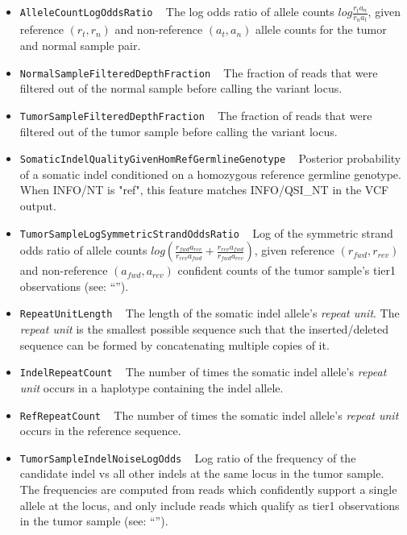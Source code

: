 \documentclass{article}
\begin{document}
\begin{itemize}
    \item \texttt{AlleleCountLogOddsRatio} ~ The log odds ratio of allele counts $log{\frac{r_t a_n} {r_n a_t}}$, given reference $(r_t,r_n)$ and non-reference $(a_t,a_n)$ allele counts for the tumor and normal sample pair.

    \item \texttt{NormalSampleFilteredDepthFraction} ~ The fraction of reads that were filtered out of the normal sample before calling the variant locus.

    \item \texttt{TumorSampleFilteredDepthFraction} ~ The fraction of reads that were filtered out of the tumor sample before calling the variant locus.

    \item \texttt{SomaticIndelQualityGivenHomRefGermlineGenotype} ~ Posterior probability of a somatic indel conditioned on a homozygous reference germline genotype. When INFO/NT is "ref", this feature matches INFO/QSI\_NT in the VCF output.

    \item \texttt{TumorSampleLogSymmetricStrandOddsRatio} ~ Log of the symmetric strand odds ratio of allele counts $log{\left( \frac{r_{fwd} a_{rev}} {r_{rev} a_{fwd}} + \frac{r_{rev} a_{fwd}} {r_{fwd} a_{rev}}\right)}$, given reference $(r_{fwd},r_{rev})$ and non-reference $(a_{fwd},a_{rev})$ confident counts of the tumor sample's tier1 observations (see: ``'').

    \item \texttt{RepeatUnitLength} ~ The length of the somatic indel allele's \emph{repeat unit}. The \emph{repeat unit} is the smallest possible sequence such that the inserted/deleted sequence can be formed by concatenating multiple copies of it.

    \item \texttt{IndelRepeatCount} ~ The number of times the somatic indel allele's \emph{repeat unit} occurs in a haplotype containing the indel allele.

    \item \texttt{RefRepeatCount} ~ The number of times the somatic indel allele's \emph{repeat unit} occurs in the reference sequence.

    \item \texttt{TumorSampleIndelNoiseLogOdds} ~ Log ratio of the frequency of the candidate indel vs all other indels at the same locus in the tumor sample. The frequencies are computed from reads which confidently support a single allele at the locus, and only include reads which qualify as tier1 observations in the tumor sample (see: ``'').


\end{itemize}
\end{document}
